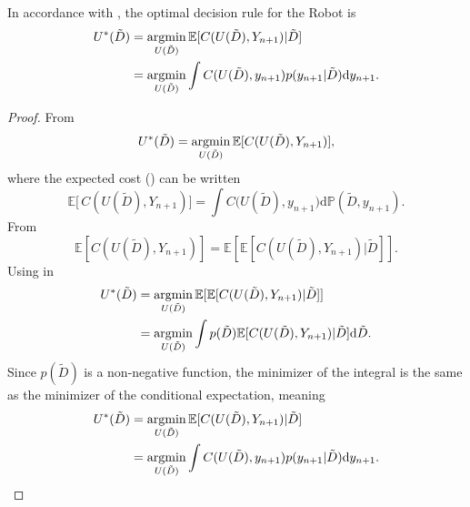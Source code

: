 \begin{theorem}
	\label{theorem:opt_decision_rule}
	In accordance with , the optimal decision rule for the Robot is
	\begin{equation}
		\begin{split}
			U^*(\tilde{D}) &= \operatorname*{argmin}_{U(\tilde{D})} \mathbb{E}[C(U(\tilde{D}), Y_{n+1})|\tilde{D}]\\
			& = \operatorname*{argmin}_{U(\tilde{D})}\int  C(U(\tilde{D}),y_{n+1}) p(y_{n+1}|\tilde{D}) \mathrm{d}y_{n+1}.
		\end{split}
		\label{eq:decision_rule3}
	\end{equation}
	
\end{theorem}
\begin{proof}
	From 
	\begin{equation}
		U^*(\tilde{D}) = \operatorname*{argmin}_{U(\tilde{D})} \mathbb{E}[C(U(\tilde{D}), Y_{n+1})],
		\label{eq:decision_rule_x}
	\end{equation}	
	where the expected cost () can be written
	\begin{equation}
			\mathbb{E}\big[\,C(U(\tilde{D}) ,Y_{n+1})\big]= \int C\big(U(\tilde{D}),y_{n+1}\big) \mathrm{d}\mathbb{P}(\tilde{D},y_{n+1}).
		\label{eq:conditional_expected_cost}
	\end{equation}
	From 
	\begin{equation}
		\mathbb{E}[C(U(\tilde{D}) , Y_{n+1})] = \mathbb{E}[\mathbb{E}[C(U(\tilde{D}) , Y_{n+1})|\tilde{D}]].
		\label{eq:total2}
	\end{equation}
	Using  in 
	\begin{equation}
		\begin{split}
			U^*(\tilde{D}) &= \operatorname*{argmin}_{U(\tilde{D}) } \mathbb{E}[\mathbb{E}[C(U(\tilde{D}) , Y_{n+1})|\tilde{D}]]\\
			&= \operatorname*{argmin}_{U(\tilde{D})} \int p(\tilde{D}) \mathbb{E}[C(U(\tilde{D}), Y_{n+1})|\tilde{D}] \mathrm{d}\tilde{D}.
		\end{split}
		\label{eq:decision_rule2}
	\end{equation}
	Since $p(\tilde{D})$ is a non-negative function, the minimizer of the integral is the same as the minimizer of the conditional expectation, meaning
	\begin{equation}
		\begin{split}
			U^*(\tilde{D}) &= \operatorname*{argmin}_{U(\tilde{D})} \mathbb{E}[C(U(\tilde{D}), Y_{n+1})|\tilde{D}]\\
			& = \operatorname*{argmin}_{U(\tilde{D})}\int  C(U(\tilde{D}),y_{n+1}) p(y_{n+1}|\tilde{D}) \mathrm{d}y_{n+1}.
		\end{split}
	\end{equation}
\end{proof}

